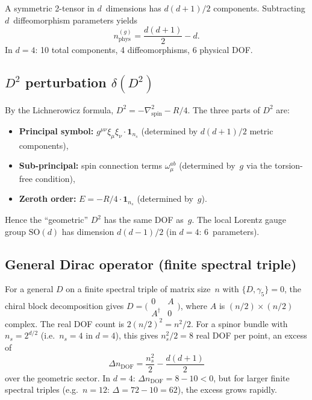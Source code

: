 \documentclass[12pt,a4paper]{article}
\theoremstyle{definition}
\theoremstyle{remark}
\begin{document}
A symmetric 2-tensor in $d$~dimensions has $d(d+1)/2$ components.
Subtracting $d$~diffeomorphism parameters yields
\begin{equation}
  n_{\mathrm{phys}}^{(g)} = \frac{d(d+1)}{2} - d.
\end{equation}
In $d = 4$: 10 total components, 4 diffeomorphisms, 6 physical DOF.

\subsection{$D^2$ perturbation $\delta(D^2)$}

By the Lichnerowicz formula, $D^2 = -\nabla^2_{\mathrm{spin}} - R/4$.
The three parts of $D^2$ are:
\begin{itemize}
  \item \textbf{Principal symbol:} $g^{\mu\nu}\xi_\mu\xi_\nu \cdot
    \mathbf{1}_{n_s}$ (determined by $d(d+1)/2$ metric components),
  \item \textbf{Sub-principal:} spin connection terms $\omega_\mu^{ab}$
    (determined by~$g$ via the torsion-free condition),
  \item \textbf{Zeroth order:} $E = -R/4 \cdot \mathbf{1}_{n_s}$
    (determined by~$g$).
\end{itemize}
Hence the ``geometric'' $D^2$ has the same DOF as~$g$.  The local Lorentz
gauge group $\mathrm{SO}(d)$ has dimension $d(d-1)/2$ (in $d=4$: 6~parameters).

\subsection{General Dirac operator (finite spectral triple)}

For a general $D$ on a finite spectral triple of matrix size~$n$ with
$\{D,\gamma_5\} = 0$, the chiral block decomposition gives
$D = \bigl(\begin{smallmatrix} 0 & A \\ A^\dag & 0 \end{smallmatrix}\bigr)$,
where $A$ is $(n/2)\times(n/2)$ complex.  The real DOF count is
$2(n/2)^2 = n^2/2$.  For a spinor bundle with $n_s = 2^{d/2}$ (i.e.\
$n_s = 4$ in $d=4$), this gives $n_s^2/2 = 8$ real DOF per point, an
excess of
\begin{equation}
  \Delta n_{\mathrm{DOF}} = \frac{n_s^2}{2} - \frac{d(d+1)}{2}
\end{equation}
over the geometric sector.  In $d = 4$: $\Delta n_{\mathrm{DOF}} = 8 - 10 < 0$,
but for larger finite spectral triples (e.g.\ $n = 12$: $\Delta = 72 - 10 = 62$),
the excess grows rapidly.
\end{document}
